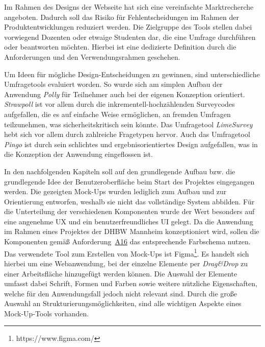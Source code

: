 Im Rahmen des Designs der Webseite hat sich eine vereinfachte Marktrecherche angeboten.
Dadurch soll das Risiko für Fehlentscheidungen im Rahmen der Produktentwicklungen reduziert werden.\autocite{Pioch2019}
Die Zielgruppe des Tools stellen dabei vorwiegend Dozenten oder etwaige Studenten dar, die eine Umfrage durchführen oder beantworten möchten.
Hierbei ist eine dedizierte Definition durch die Anforderungen und den Verwendungsrahmen geschehen.

Um Ideen für mögliche Design-Entscheidungen zu gewinnen, sind unterschiedliche Umfragetools evaluiert worden.
So wurde sich am simplen Aufbau der Anwendung \emph{Polly} für Teilnehmer auch bei der eigenen Konzeption orientiert.
\emph{Strawpoll} ist vor allem durch die inkrementell-hochzählenden Surveycodes aufgefallen, die es auf einfache Weise ermöglichen, an fremden Umfragen teilzunehmen, was sicherheitskritisch sein könnte.
Das Umfragetool \emph{LimeSurvey} hebt sich vor allem durch zahlreiche Fragetypen hervor.
Auch das Umfragetool \emph{Pingo} ist durch sein schlichtes und ergebnisorientiertes Design aufgefallen, was in die Konzeption der Anwendung eingeflossen ist.

In den nachfolgenden Kapiteln soll auf den grundlegende Aufbau bzw. die grundlegende Idee der Benutzeroberfläche beim Start des Projektes eingegangen werden.
Die gezeigten Mock-Ups wurden lediglich zum Aufbau und zur Orientierung entworfen, weshalb sie nicht das vollständige System abbilden.
Für die Unterteilung der verschiedenen Komponenten wurde der Wert besonders auf eine angenehme \acf{UX} und ein benutzerfreundliches \acf{UI} gelegt.
Da die Anwendung im Rahmen eines Projektes der \acs{DHBW} Mannheim konzeptioniert wird, sollen die Komponenten gemäß Anforderung~\hyperref[Anf:A16]{A16} das entsprechende Farbschema nutzen.
Das verwendete Tool zum Erstellen von Mock-Ups ist Figma\footnote{https://www.figma.com/}.
Es handelt sich hierbei um eine Webanwendung, bei der einzelne Elemente per \emph{Drag\&Drop} zu einer Arbeitsfläche hinzugefügt werden können.
Die Auswahl der Elemente umfasst dabei Schrift, Formen und Farben sowie weitere nützliche Eigenschaften, welche für den Anwendungsfall jedoch nicht relevant sind.
Durch die große Auswahl an Strukturierungsmöglichkeiten, sind alle wichtigen Aspekte eines Mock-Up-Tools vorhanden.
